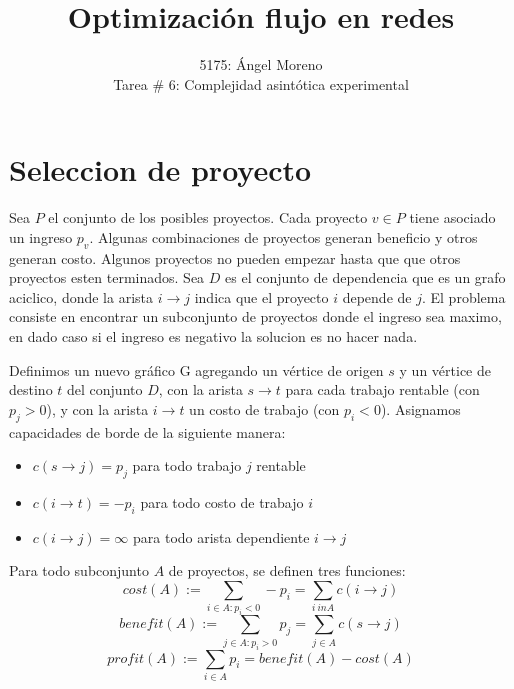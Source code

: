 \documentclass[12pt, a4paper]{article}
\author{5175: \'Angel Moreno \\ Tarea \# 6: Complejidad asintótica experimental}
\title{Optimizaci\'on flujo en redes}
\begin{document}
\maketitle

\section*{Seleccion de proyecto}

Sea $P$ el conjunto de los posibles proyectos. Cada proyecto $v \in P$ tiene asociado un ingreso $p_{v}$. Algunas combinaciones de proyectos generan beneficio y otros generan costo. Algunos proyectos no pueden empezar hasta que que otros proyectos esten terminados. Sea $D$ es el conjunto de dependencia que es un grafo aciclico, donde la arista $i \to j$ indica que el proyecto $i$ depende de $j$. El problema consiste en encontrar un subconjunto de proyectos donde el ingreso sea maximo, en dado caso si el ingreso es negativo la solucion es no hacer nada.

Definimos un nuevo gráfico G agregando un vértice de origen $s$ y un vértice de destino $t$ del conjunto $D$, con la arista $s \to t$ para cada trabajo rentable (con $p_j> 0$), y con la arista $i \to t$ un costo de
trabajo (con $p_i <0$). Asignamos capacidades de borde de la siguiente manera:
\begin{itemize}
\item $c(s \to j) = p_{j}$ para todo trabajo $j$ rentable
\item $c(i \to t) = -p_{i}$ para todo costo de trabajo $i$
\item $c(i \to j) = \infty$ para todo arista dependiente $i \to j$
\end{itemize}

Para todo subconjunto $A$ de proyectos, se definen tres funciones:
\[ cost(A) := \sum_{i \in A: p_i < 0} -p_i = \sum_{i \ in A} c(i \to j) \]
\[ benefit(A) := \sum_{j \in A: p_i > 0} p_j = \sum_{j \in A} c(s \to j) \]
\[ profit(A) := \sum_{i \in A} p_i = benefit(A) - cost(A) \]
\end{document}

